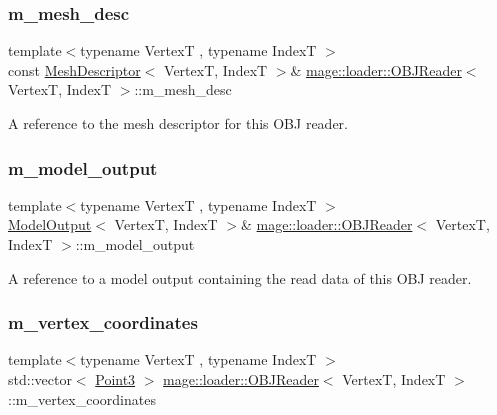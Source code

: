 \subsubsection{\texorpdfstring{m\+\_\+mesh\+\_\+desc}{m\_mesh\_desc}}
{\footnotesize\ttfamily template$<$typename VertexT , typename IndexT $>$ \\
const \hyperlink{structmage_1_1_mesh_descriptor}{Mesh\+Descriptor}$<$ VertexT, IndexT $>$\& \hyperlink{classmage_1_1loader_1_1_o_b_j_reader}{mage\+::loader\+::\+O\+B\+J\+Reader}$<$ VertexT, IndexT $>$\+::m\+\_\+mesh\+\_\+desc\hspace{0.3cm}{\ttfamily [private]}}

A reference to the mesh descriptor for this O\+BJ reader. \hypertarget{classmage_1_1loader_1_1_o_b_j_reader_a19ba3dbb5f6d5a7090d6b2cf12a4979a}{}\label{classmage_1_1loader_1_1_o_b_j_reader_a19ba3dbb5f6d5a7090d6b2cf12a4979a} 
\subsubsection{\texorpdfstring{m\+\_\+model\+\_\+output}{m\_model\_output}}
{\footnotesize\ttfamily template$<$typename VertexT , typename IndexT $>$ \\
\hyperlink{structmage_1_1_model_output}{Model\+Output}$<$ VertexT, IndexT $>$\& \hyperlink{classmage_1_1loader_1_1_o_b_j_reader}{mage\+::loader\+::\+O\+B\+J\+Reader}$<$ VertexT, IndexT $>$\+::m\+\_\+model\+\_\+output\hspace{0.3cm}{\ttfamily [private]}}

A reference to a model output containing the read data of this O\+BJ reader. \hypertarget{classmage_1_1loader_1_1_o_b_j_reader_adf05a751f03eeaccccf496710be4cae9}{}\label{classmage_1_1loader_1_1_o_b_j_reader_adf05a751f03eeaccccf496710be4cae9} 
\subsubsection{\texorpdfstring{m\+\_\+vertex\+\_\+coordinates}{m\_vertex\_coordinates}}
{\footnotesize\ttfamily template$<$typename VertexT , typename IndexT $>$ \\
std\+::vector$<$ \hyperlink{structmage_1_1_point3}{Point3} $>$ \hyperlink{classmage_1_1loader_1_1_o_b_j_reader}{mage\+::loader\+::\+O\+B\+J\+Reader}$<$ VertexT, IndexT $>$\+::m\+\_\+vertex\+\_\+coordinates\hspace{0.3cm}{\ttfamily [private]}}

